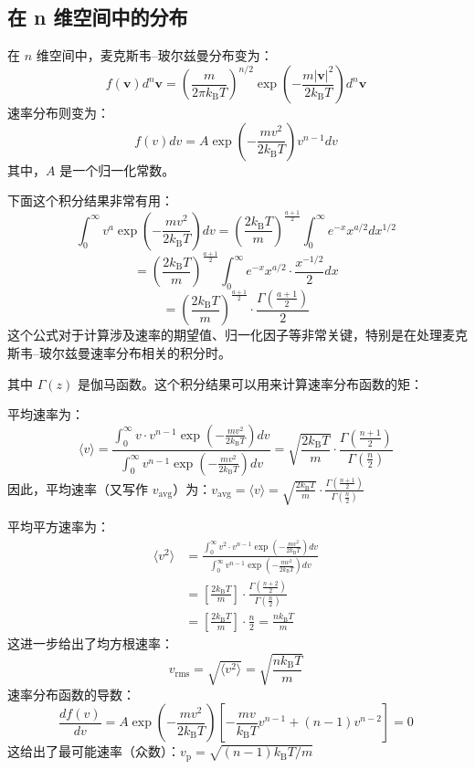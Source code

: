 \subsection{在 n 维空间中的分布}
在 $n$ 维空间中，麦克斯韦–玻尔兹曼分布变为：
$$
f(\mathbf{v}) d^n\mathbf{v} = \left( \frac{m}{2\pi k_{\text{B}} T} \right)^{n/2} \exp\left( -\frac{m |\mathbf{v}|^2}{2k_{\text{B}} T} \right) d^n\mathbf{v}~
$$
速率分布则变为：
$$
f(v) dv = A \exp\left( -\frac{m v^2}{2k_{\text{B}} T} \right) v^{n-1} dv~
$$
其中，$A$ 是一个归一化常数。

下面这个积分结果非常有用：
$$
\int_0^\infty v^a \exp\left( -\frac{m v^2}{2k_{\text{B}} T} \right) dv = \left( \frac{2k_{\text{B}} T}{m} \right)^{\frac{a+1}{2}} \int_0^\infty e^{-x} x^{a/2} dx^{1/2}~
$$
$$
= \left( \frac{2k_{\text{B}} T}{m} \right)^{\frac{a+1}{2}} \int_0^\infty e^{-x} x^{a/2} \cdot \frac{x^{-1/2}}{2} dx~
$$
$$
= \left( \frac{2k_{\text{B}} T}{m} \right)^{\frac{a+1}{2}} \cdot \frac{\Gamma\left( \frac{a+1}{2} \right)}{2}~
$$
这个公式对于计算涉及速率的期望值、归一化因子等非常关键，特别是在处理麦克斯韦–玻尔兹曼速率分布相关的积分时。

其中 $\Gamma(z)$ 是伽马函数。这个积分结果可以用来计算速率分布函数的矩：

平均速率为：
$$
\langle v \rangle = \frac{ \int_0^\infty v \cdot v^{n-1} \exp\left( -\frac{m v^2}{2k_{\text{B}}T} \right) dv }{ \int_0^\infty v^{n-1} \exp\left( -\frac{m v^2}{2k_{\text{B}}T} \right) dv } = \sqrt{ \frac{2k_{\text{B}}T}{m} } \cdot \frac{ \Gamma\left( \frac{n+1}{2} \right) }{ \Gamma\left( \frac{n}{2} \right) }~
$$
因此，平均速率（又写作 $v_{\text{avg}}$）为：$v_{\text{avg}} = \langle v \rangle = \sqrt{ \frac{2k_{\text{B}}T}{m} } \cdot \frac{ \Gamma\left( \frac{n+1}{2} \right) }{ \Gamma\left( \frac{n}{2} \right) }$

平均平方速率为：
$$
\begin{aligned}
\langle v^2 \rangle &= \frac{ \int_0^\infty v^2 \cdot v^{n-1} \exp\left( -\frac{m v^2}{2k_{\text{B}}T} \right) dv }{ \int_0^\infty v^{n-1} \exp\left( -\frac{m v^2}{2k_{\text{B}}T} \right) dv } \\
&= \left[\frac{2k_{\text{B}}T}{m} \right] \cdot \frac{ \Gamma\left( \frac{n+2}{2} \right) }{ \Gamma\left( \frac{n}{2} \right) } \\
&= \left[\frac{2k_{\text{B}}T}{m} \right] \cdot \frac{n}{2} = \frac{n k_{\text{B}} T}{m}
\end{aligned}~
$$
这进一步给出了均方根速率：
$$
v_{\text{rms}} = \sqrt{ \langle v^2 \rangle } = \sqrt{ \frac{n k_{\text{B}} T}{m} }~
$$
速率分布函数的导数：
$$
\frac{df(v)}{dv} = A \exp\left( -\frac{mv^2}{2k_{\text{B}}T} \right) \left[ -\frac{mv}{k_{\text{B}}T} v^{n-1} + (n-1) v^{n-2} \right] = 0~
$$
这给出了最可能速率（众数）：$v_{\text{p}} = \sqrt{ (n - 1)k_{\text{B}} T/m }$
